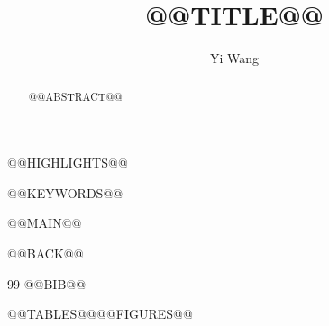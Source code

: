 \documentclass[preprint,12pt]{elsarticle}
\begin{document}
\doublespacing

\begin{frontmatter}

\title{@@TITLE@@}

\author{Yi Wang}

\begin{abstract}
@@ABSTRACT@@
\end{abstract}

\begin{highlights}
@@HIGHLIGHTS@@
\end{highlights}

\begin{keyword}
@@KEYWORDS@@
\end{keyword}

\end{frontmatter}

\linenumbers

@@MAIN@@

@@BACK@@

\begin{thebibliography}{99}
@@BIB@@
\end{thebibliography}

@@TABLES@@@@FIGURES@@
\end{document}
